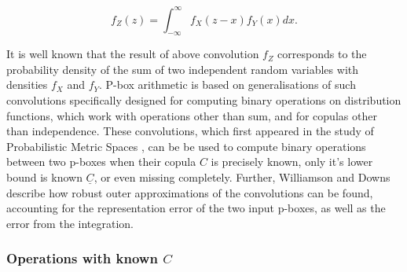 \documentclass{juliacon}
\begin{document}
\begin{equation*}
  f_{Z}(z) = \int^{\infty}_{-\infty}f_{X}(z-x)f_{Y}(x)dx .
\end{equation*}

It is well known that the result of above convolution $f_{Z}$ corresponds to the probability density of the sum of two independent random variables with densities $f_{X}$ and $f_{Y}$. P-box arithmetic is based on generalisations of such convolutions specifically designed for computing binary operations on distribution functions, which work with operations other than sum, and for copulas other than independence. These convolutions, which first appeared in the study of Probabilistic Metric Spaces \cite{schweizer2011probabilistic}, can be be used to compute binary operations between two p-boxes when their copula $C$ is precisely known, only it's lower bound is known $\underline{C}$, or even missing completely. Further, Williamson and Downs \cite{williamson1990probabilistic} describe how robust outer approximations of the convolutions can be found, accounting for the representation error of the two input p-boxes, as well as the error from the integration.

\subsubsection{Operations with known $C$} \hfill \break
\end{document}
